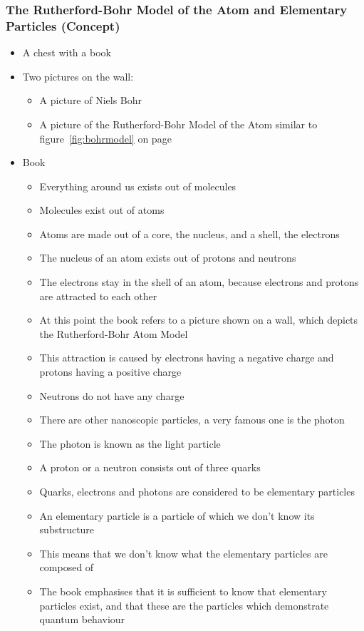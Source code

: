 \documentclass[11pt,twoside]{report} %
\begin{document}
\subsubsection{The Rutherford-Bohr Model of the Atom and Elementary Particles (Concept)}
\begin{itemize}
	\item A chest with a book
	\item Two pictures on the wall:
	\begin{itemize}
		\item A picture of Niels Bohr
		\item A picture of the Rutherford-Bohr Model of the Atom similar to figure~\ref{fig:bohrmodel} on page~\pageref{fig:bohrmodel}
	\end{itemize}
	\item Book
	\begin{itemize}
		\item Everything around us exists out of molecules
		\item Molecules exist out of atoms
		\item Atoms are made out of a core, the nucleus, and a shell, the electrons
		\item The nucleus of an atom exists out of protons and neutrons
		\item The electrons stay in the shell of an atom, because electrons and protons are attracted to each other
		\item At this point the book refers to a picture shown on a wall, which depicts the Rutherford-Bohr Atom Model
		\item This attraction is caused by electrons having a negative charge and protons having a positive charge
		\item Neutrons do not have any charge
		\item There are other nanoscopic particles, a very famous one is the photon
		\item The photon is known as the light particle
		\item A proton or a neutron consists out of three quarks
		\item Quarks, electrons and photons are considered to be elementary particles
		\item An elementary particle is a particle of which we don’t know its substructure
		\item This means that we don’t know what the elementary particles are composed of
		\item The book emphasises that it is sufficient to know that elementary particles exist, and that these are the particles which demonstrate quantum behaviour

\end{itemize}
\end{itemize}
\end{document}
